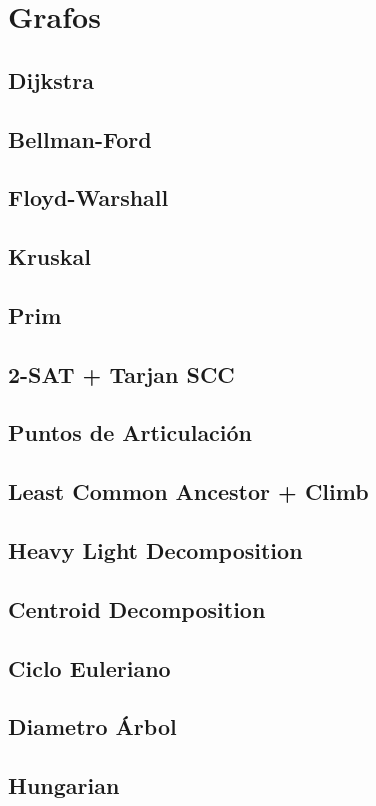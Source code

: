 \section{Grafos}
\subsection{Dijkstra}

\subsection{Bellman-Ford}

\subsection{Floyd-Warshall}

\subsection{Kruskal}

\subsection{Prim}

\subsection{2-SAT + Tarjan SCC}

\subsection{Puntos de Articulaci\'on}

\subsection{Least Common Ancestor + Climb}

\subsection{Heavy Light Decomposition}

\subsection{Centroid Decomposition}

\subsection{Ciclo Euleriano}

\subsection{Diametro \'Arbol}

\subsection{Hungarian}
